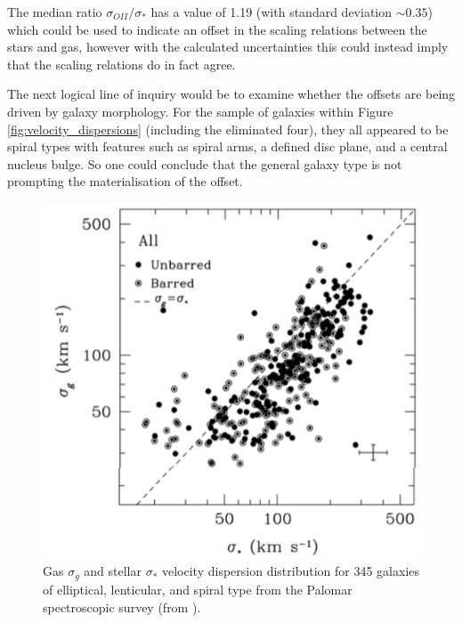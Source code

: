 \documentclass[12pt, twocolumn, nofootinbib]{revtex4-1}    %
\begin{document}
The median ratio $\sigma_{OII}/\sigma_*$ has a value of 1.19 (with standard deviation $\sim0.35$) which could be used to indicate an offset in the scaling relations between the stars and gas, however with the calculated uncertainties this could instead imply that the scaling relations do in fact agree. 

The next logical line of inquiry would be to examine whether the offsets are being driven by galaxy morphology. For the sample of galaxies within Figure \ref{fig:velocity_dispersions} (including the eliminated four), they all appeared to be spiral types with features such as spiral arms, a defined disc plane, and a central nucleus bulge. So one could conclude that the general galaxy type is not prompting the materialisation of the offset. 

\begin{figure}
\includegraphics[width=1.0\linewidth]{data/ho_2009.pdf}
\caption{Gas $\sigma_g$ and stellar $\sigma_*$ velocity dispersion distribution for 345 galaxies of elliptical, lenticular, and spiral type from the Palomar spectroscopic survey (from \cite{2009ApJ...699..638H}).}
\label{fig:ho_2009}
\end{figure} 
\end{document}
